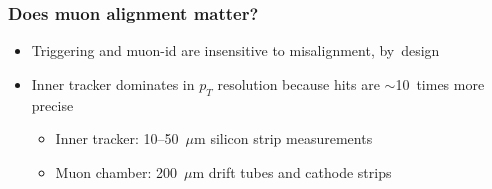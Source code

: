 \documentclass[compress]{beamer}
\begin{document}
\begin{frame}
\frametitle{Does muon alignment matter?}

\begin{itemize}\setlength{\itemsep}{0.25 cm}
\item Triggering and muon-id are insensitive to misalignment, \mbox{by design\hspace{-1 cm}}

\item Inner tracker dominates in $p_T$ resolution because hits are $\sim$10~times more precise
\begin{itemize}
\item Inner tracker: 10--50~$\mu$m silicon strip measurements
\item Muon chamber: 200~$\mu$m drift tubes and cathode strips
\end{itemize}


\end{itemize}
\end{frame}
\end{document}
